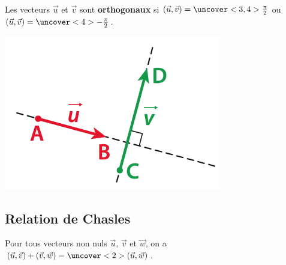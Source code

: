 \documentclass{beamer}
\theoremstyle{plain}
\begin{document}
 \begin{frame}
 \begin{definition}
 ~\vspace{-0.5cm}
 
   Les vecteurs $\vec{u}$ et $\vec{v}$ sont \textbf{orthogonaux} si
   $(\vec{u},\vec{v})=\uncover<3,4>{\frac{\pi}{2}}$ ou 
   $(\vec{u},\vec{v})=\uncover<4>{-\frac{\pi}{2}}$.
   \begin{center}
      \includegraphics[scale=0.5]{../Images/Ortho.png}
   \end{center}

 \end{definition}
 
 \end{frame}
 
  \subsection{Relation de Chasles}
 
 \begin{frame}
 \begin{theorem}
  Pour tous vecteurs non nuls $\vec{u}$, $\vec{v}$ et $\vec{w}$, on a 
  $(\vec{u},\vec{v})+(\vec{v},\vec{w})=\uncover<2>{(\vec{u},\vec{w})}$.
 \end{theorem}
 \end{frame}
 
\end{document}
